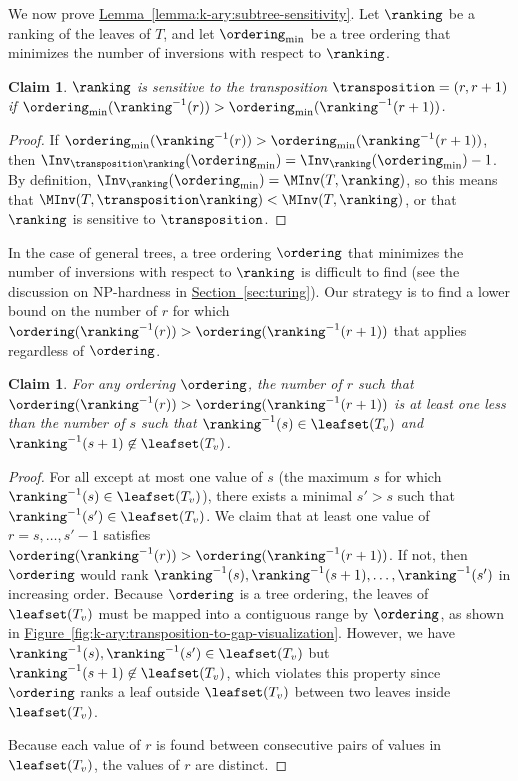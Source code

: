 \documentclass[11pt]{article}
\numberwithin{equation}{section}
\newtheorem{claim}[theorem]{Claim}
\theoremstyle{definition}
\theoremstyle{plain}
\newcommand{\expref}[2]{\hyperref[#2]{#1~\ref{#2}}}
\begin{document}
We now prove \expref{Lemma}{lemma:k-ary:subtree-sensitivity}. Let $\ranking$ be a ranking of the leaves of $T$, and let $\ordering_{\min}$ be a tree ordering that minimizes the number of inversions with respect to $\ranking$.

\begin{claim}
    \label{claim:k-ary:decreasing-transposition}
    $\ranking$ is sensitive to the transposition $\transposition=(r,r+1)$ if $\ordering_{\min}(\ranking^{-1}(r))>\ordering_{\min}(\ranking^{-1}(r+1))$.
\end{claim}

\begin{proof}
    If $\ordering_{\min}(\ranking^{-1}(r))>\ordering_{\min}(\ranking^{-1}(r+1))$, then $\Inv_{\transposition \ranking}(\ordering_{\min})=\Inv_{\ranking}(\ordering_{\min})-1$. By definition, $\Inv_{\ranking}(\ordering_{\min})=\MInv(T,\ranking)$, so this means that $\MInv(T,\transposition \ranking)< \MInv(T,\ranking)$, or that $\ranking$ is sensitive to $\transposition$.
\end{proof}

In the case of general trees, a tree ordering $\ordering$ that minimizes the number of inversions with respect to $\ranking$ is difficult to find (see the discussion on NP-hardness in \expref{Section}{sec:turing}). Our strategy is to find a lower bound on the number of $r$ for which $\ordering(\ranking^{-1}(r))>\ordering(\ranking^{-1}(r+1))$ that applies regardless of $\ordering$.

\begin{claim}
    \label{claim:k-ary:transposition-to-gap}
    For any ordering $\ordering$, the number of $r$ such that $\ordering(\ranking^{-1}(r))>\ordering(\ranking^{-1}(r+1))$ is at least one less than the number of $s$ such that $\ranking^{-1}(s)\in \leafset(T_v)$ and $\ranking^{-1}(s+1)\not\in \leafset(T_v)$.
\end{claim}

\begin{proof}
    For all except at most one value of $s$ (the maximum $s$ for which $\ranking^{-1}(s)\in \leafset(T_v)$), there exists a minimal $s'>s$ such that $\ranking^{-1}(s')\in \leafset(T_v)$. We claim that at least one value of $r=s,\dots,s'-1$ satisfies $\ordering(\ranking^{-1}(r))>\ordering(\ranking^{-1}(r+1))$. If not, then $\ordering$ would rank $\ranking^{-1}(s),\ranking^{-1}(s+1),\dots,\ranking^{-1}(s')$ in increasing order. Because $\ordering$ is a tree ordering, the leaves of $\leafset(T_v)$ must be mapped into a contiguous range by $\ordering$, as shown in \expref{Figure}{fig:k-ary:transposition-to-gap-visualization}. However, we have $\ranking^{-1}(s),\ranking^{-1}(s')\in \leafset(T_v)$ but $\ranking^{-1}(s+1)\not\in \leafset(T_v)$, which violates this property since $\ordering$ ranks a leaf outside $\leafset(T_v)$ between two leaves inside $\leafset(T_v)$.
    
    Because each value of $r$ is found between consecutive pairs of values in $\leafset(T_v)$, the values of $r$ are distinct.
\end{proof}
\end{document}
